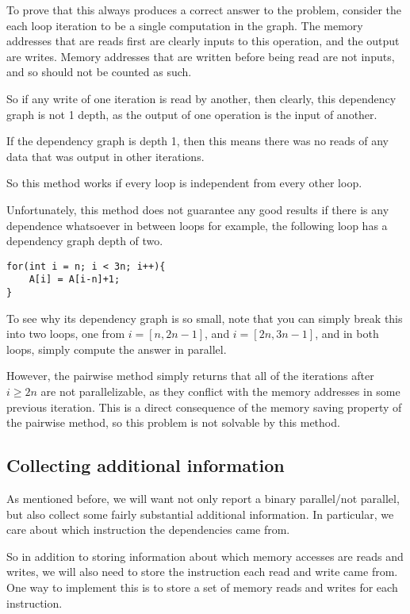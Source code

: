 \documentclass[12pt,twoside]{reedthesis}
\begin{document}
		To prove that this always produces a correct answer to the problem, consider the each loop iteration to be a single computation in the graph. The memory addresses that are reads first are clearly inputs to this operation, and the output are writes. Memory addresses that are written before being read are not inputs, and so should not be counted as such.

		So if any write of one iteration is read by another, then clearly, this dependency graph is not 1 depth, as the output of one operation is the input of another.

		If the dependency graph is depth 1, then this means there was no reads of any data that was output in other iterations.

		So this method works if every loop is independent from every other loop.

		Unfortunately, this method does not guarantee any good results if there is any dependence whatsoever in between loops for example, the following loop has a dependency graph depth of two.

\begin{lstlisting}
for(int i = n; i < 3n; i++){
	A[i] = A[i-n]+1;
}
\end{lstlisting}

		To see why its dependency graph is so small, note that you can simply break this into two loops, one from $i = [n,2n-1]$, and $i=[2n,3n-1]$, and in both loops, simply compute the answer in parallel.

		However, the pairwise method simply returns that all of the iterations after $i \ge 2n$ are not parallelizable, as they conflict with the memory addresses in some previous iteration. This is a direct consequence of the memory saving property of the pairwise method, so this problem is not solvable by this method.

		\subsection{Collecting additional information}

		As mentioned before, we will want not only report a binary parallel/not parallel, but also collect some fairly substantial additional information. In particular, we care about which instruction the dependencies came from.

		So in addition to storing information about which memory accesses are reads and writes, we will also need to store the instruction each read and write came from. One way to implement this is to store a set of memory reads and writes for each instruction.
\end{document}
